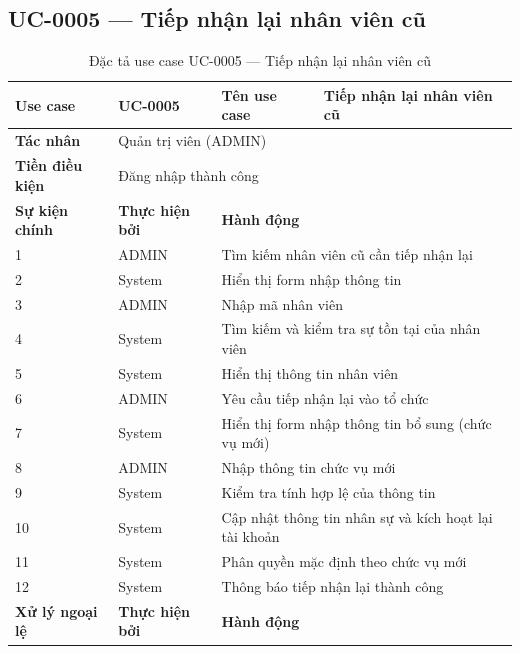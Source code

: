 \documentclass[../DoAn.tex]{subfiles}
\begin{document}
\subsection{UC-0005 — Tiếp nhận lại nhân viên cũ}

\begin{table}[H]
\centering
\caption{Đặc tả use case UC-0005 — Tiếp nhận lại nhân viên cũ}
\label{tab:uc-0005}
\renewcommand{\arraystretch}{1.3}
\begin{tabular}{|p{3.0cm}|p{2.3cm}|p{2.7cm}|p{4.5cm}|}
\hline
\textbf{Use case} & UC-0005 & \textbf{Tên use case} & Tiếp nhận lại nhân viên cũ \\
\hline
\textbf{Tác nhân} & \multicolumn{3}{p{9.5cm}|}{Quản trị viên (ADMIN)} \\
\hline
\textbf{Tiền điều kiện} & \multicolumn{3}{p{9.5cm}|}{Đăng nhập thành công} \\
\hline
\textbf{Sự kiện chính} & \textbf{Thực hiện bởi} & \multicolumn{2}{p{7.2cm}|}{\textbf{Hành động}} \\
\hline
1 & ADMIN & \multicolumn{2}{p{7.2cm}|}{Tìm kiếm nhân viên cũ cần tiếp nhận lại} \\
\hline
2 & System & \multicolumn{2}{p{7.2cm}|}{Hiển thị form nhập thông tin} \\
\hline
3 & ADMIN & \multicolumn{2}{p{7.2cm}|}{Nhập mã nhân viên} \\
\hline
4 & System & \multicolumn{2}{p{7.2cm}|}{Tìm kiếm và kiểm tra sự tồn tại của nhân viên} \\
\hline
5 & System & \multicolumn{2}{p{7.2cm}|}{Hiển thị thông tin nhân viên} \\
\hline
6 & ADMIN & \multicolumn{2}{p{7.2cm}|}{Yêu cầu tiếp nhận lại vào tổ chức} \\
\hline
7 & System & \multicolumn{2}{p{7.2cm}|}{Hiển thị form nhập thông tin bổ sung (chức vụ mới)} \\
\hline
8 & ADMIN & \multicolumn{2}{p{7.2cm}|}{Nhập thông tin chức vụ mới} \\
\hline
9 & System & \multicolumn{2}{p{7.2cm}|}{Kiểm tra tính hợp lệ của thông tin} \\
\hline
10 & System & \multicolumn{2}{p{7.2cm}|}{Cập nhật thông tin nhân sự và kích hoạt lại tài khoản} \\
\hline
11 & System & \multicolumn{2}{p{7.2cm}|}{Phân quyền mặc định theo chức vụ mới} \\
\hline
12 & System & \multicolumn{2}{p{7.2cm}|}{Thông báo tiếp nhận lại thành công} \\
\hline
\textbf{Xử lý ngoại lệ} & \textbf{Thực hiện bởi} & \multicolumn{2}{p{7.2cm}|}{\textbf{Hành động}} \\

\end{tabular}
\end{table}
\end{document}

